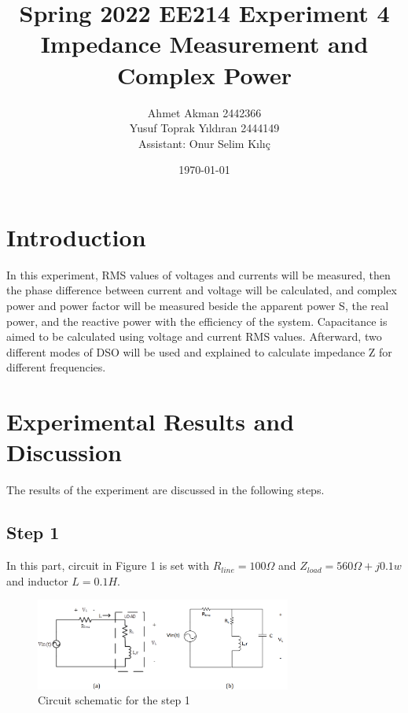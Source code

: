 \documentclass[letterpaper,12pt]{article}
\begin{document}
\thispagestyle{empty}

\title{Spring 2022 EE214 Experiment 4  \protect\\ Impedance Measurement and Complex Power}
\author{Ahmet Akman 2442366 \protect\\ Yusuf Toprak Yıldıran 2444149 \protect\\ Assistant: Onur Selim Kılıç}
\date{\today}
\maketitle
\tableofcontents
\section{Introduction}
In this experiment, RMS values of voltages and currents will be measured, then the phase difference between current and voltage will be calculated, and complex power and power factor will be measured beside the apparent power S, the real power, and the reactive power with the efficiency of the system. Capacitance is aimed to be calculated using voltage and current RMS values. Afterward, two different modes of DSO will be used and explained to calculate impedance Z for different frequencies.

\section{Experimental Results and Discussion}
The results of the experiment are discussed in the following steps.
%
\subsection{Step 1}

In this part, circuit in Figure 1 is set with \(R_{line}= 100\Omega\) and \(Z_{load}= 560\Omega + j0.1w\) and inductor \(L= 0.1H\).

\begin{figure}[H]
    \centering
    \includegraphics[width = 0.75\textwidth]{1SCH.png}
    \caption{Circuit schematic for the step 1}
\end{figure} 
\end{document}
